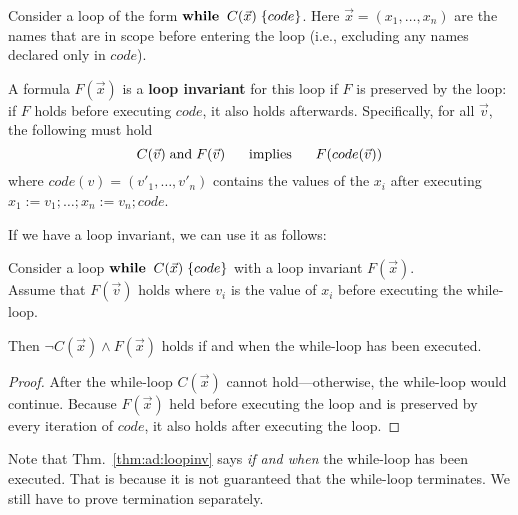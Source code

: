 \begin{definition}\label{def:ad:loopinv}
Consider a loop of the form $\awhileI{C(\vec{x})}{code}$.
Here $\vec{x}=(x_1,\ldots,x_n)$ are the names that are in scope before entering the loop (i.e., excluding any names declared only in $code$).

A formula $F(\vec{x})$ is a \textbf{loop invariant} for this loop if $F$ is preserved by the loop: if $F$ holds before executing $code$, it also holds afterwards.
 Specifically, for all $\vec{v}$, the following must hold
   \[C(\vec{v}) \;\mathrm{and}\; F(\vec{v}) \hspace*{.5cm} \;\mathrm{implies}\;\hspace*{.5cm} F(code(\vec{v}))\]
   where $code(v)=(v'_1,\ldots,v'_n)$ contains the values of the $x_i$ after executing $x_1:=v_1; \ldots; x_n:=v_n; code$.
\end{definition}

If we have a loop invariant, we can use it as follows:
\begin{theorem}\label{thm:ad:loopinv}
Consider a loop $\awhileI{C(\vec{x})}{code}$ with a loop invariant $F(\vec{x})$.\\
Assume that $F(\vec{v})$ holds where $v_i$ is the value of $x_i$ before executing the while-loop.
\medskip

Then $\neg C(\vec{x}) \wedge F(\vec{x})$ holds if and when the while-loop has been executed.\footnotemark
\end{theorem}
\begin{proof}
After the while-loop $C(\vec{x})$ cannot hold---otherwise, the while-loop would continue.
Because $F(\vec{x})$ held before executing the loop and is preserved by every iteration of $code$, it also holds after executing the loop.
\end{proof}

Note that Thm.~\ref{thm:ad:loopinv} says \emph{if and when} the while-loop has been executed.
That is because it is not guaranteed that the while-loop terminates.
We still have to prove termination separately.


